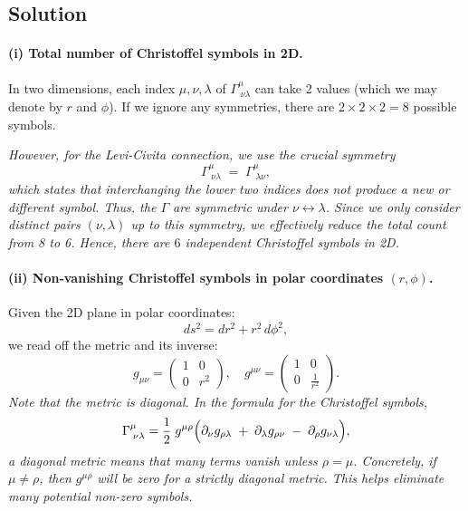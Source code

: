 \subsection*{Solution}

\paragraph{(i) Total number of Christoffel symbols in 2D.}

In two dimensions, each index \(\mu,\nu,\lambda\) of \(\Gamma^\mu_{\;\nu\lambda}\) can take 2 values (which we may denote by \(r\) and \(\phi\)). If we ignore any symmetries, there are \(2 \times 2 \times 2 = 8\) possible symbols.

\emph{However, for the Levi-Civita connection, we use the crucial symmetry}
\[
\Gamma^\mu_{\;\nu\lambda} \;=\; \Gamma^\mu_{\;\lambda\nu},
\]
\emph{which states that interchanging the lower two indices does not produce a new or different symbol. Thus, the \(\Gamma\) are symmetric under \(\nu \leftrightarrow \lambda\). Since we only consider distinct pairs \((\nu,\lambda)\) up to this symmetry, we effectively reduce the total count from 8 to 6. Hence, there are \(\boxed{6}\) independent Christoffel symbols in 2D.}

\paragraph{(ii) Non-vanishing Christoffel symbols in polar coordinates \((r,\phi)\).}

Given the 2D plane in polar coordinates:
\[
ds^2 = dr^2 + r^2\,d\phi^2,
\]
we read off the metric and its inverse:
\[
g_{\mu\nu}
=
\begin{pmatrix}
1 & 0 \\
0 & r^2
\end{pmatrix},
\quad
g^{\mu\nu}
=
\begin{pmatrix}
1 & 0 \\
0 & \frac{1}{r^2}
\end{pmatrix}.
\]
\emph{Note that the metric is diagonal. In the formula for the Christoffel symbols,}
\[
\Gamma^\mu_{\;\nu\lambda}
=
\frac{1}{2}\;g^{\mu\rho}
\Bigl(
\partial_\nu g_{\rho\lambda}
\;+\;
\partial_\lambda g_{\rho\nu}
\;-\;
\partial_\rho g_{\nu\lambda}
\Bigr),
\]
\emph{a diagonal metric means that many terms vanish unless \(\rho = \mu\). Concretely, if \(\mu\neq\rho\), then \(g^{\mu\rho}\) will be zero for a strictly diagonal metric. This helps eliminate many potential non-zero symbols.}


